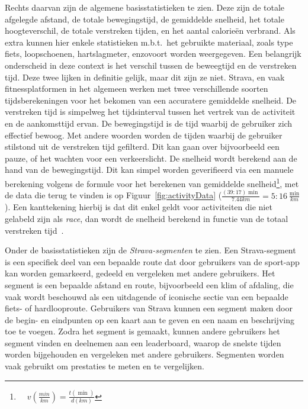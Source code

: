 Rechts daarvan zijn de algemene basisstatistieken te zien. Deze zijn de totale
afgelegde afstand, de totale bewegingstijd, de gemiddelde snelheid, het totale
hoogteverschil, de totale verstreken tijden, en het aantal calorieën verbrand.
Als extra kunnen hier enkele statistieken m.b.t.\ het gebruikte materiaal,
zoals type fiets, loopschoenen, hartslagmeter, enzovoort worden weergegeven.
Een belangrijk onderscheid in deze context is het verschil tussen de beweegtijd
en de verstreken tijd. Deze twee lijken in definitie gelijk, maar dit zijn ze
niet. Strava, en vaak fitnessplatformen in het algemeen werken met twee
verschillende soorten tijdsberekeningen voor het bekomen van een accuratere
gemiddelde snelheid. De verstreken tijd is simpelweg het tijdsinterval tussen
het vertrek van de activiteit en de aankomsttijd ervan. De bewegingstijd is de
tijd waarbij de gebruiker zich effectief bewoog. Met andere woorden worden de
tijden waarbij de gebruiker stilstond uit de verstreken tijd gefilterd. Dit kan
gaan over bijvoorbeeld een pauze, of het wachten voor een verkeerslicht. De
snelheid wordt berekend aan de hand van de bewegingstijd. Dit kan simpel worden
geverifieerd via een manuele berekening volgens de formule voor het berekenen
van gemiddelde snelheid\footnote{$ \quad v(\frac{min}{km}) =
        \frac{t(\min)}{d(km)}$}, met de data die terug te vinden is op
Figuur~\ref{fig:activityData} ($\frac{(39:17)\min}{7.44 km} = 5:16
\frac{\min}{km}$). Een kanttekening hierbij is dat dit enkel geldt voor
activiteiten die niet gelabeld zijn als \textit{race}, dan wordt de snelheid
berekend in functie van de totaal verstreken tijd~\cite{MovingTi80:online}.

Onder de basisstatistieken zijn de \textit{Strava-segmenten} te zien. Een
Strava-segment is een specifiek deel van een bepaalde route dat door gebruikers
van de sport-app kan worden gemarkeerd, gedeeld en vergeleken met andere
gebruikers. Het segment is een bepaalde afstand en route, bijvoorbeeld een klim
of afdaling, die vaak wordt beschouwd als een uitdagende of iconische sectie
van een bepaalde fiets- of hardlooproute. Gebruikers van Strava kunnen een
segment maken door de begin- en eindpunten op een kaart aan te geven en een
naam en beschrijving toe te voegen. Zodra het segment is gemaakt, kunnen andere
gebruikers het segment vinden en deelnemen aan een leaderboard, waarop de
snelste tijden worden bijgehouden en vergeleken met andere gebruikers.
Segmenten worden vaak gebruikt om prestaties te meten en te vergelijken.

